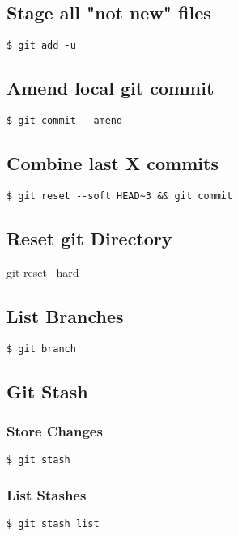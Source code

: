 \documentclass{article}
\begin{document}
\begin{multicols}{3}
\subsection{Stage all "not new" files}
\lstinline|$ git add -u|

\subsection{Amend local git commit}
\lstinline|$ git commit --amend|

\subsection{Combine last X commits}
\lstinline|$ git reset --soft HEAD~3 && git commit|

\subsection{Reset git Directory}
git reset --hard

\subsection{List Branches}
\lstinline|$ git branch|

\subsection{Git Stash}
\subsubsection{Store Changes}
\lstinline|$ git stash|

\subsubsection{List Stashes}
\lstinline|$ git stash list|

\end{multicols}
\end{document}
